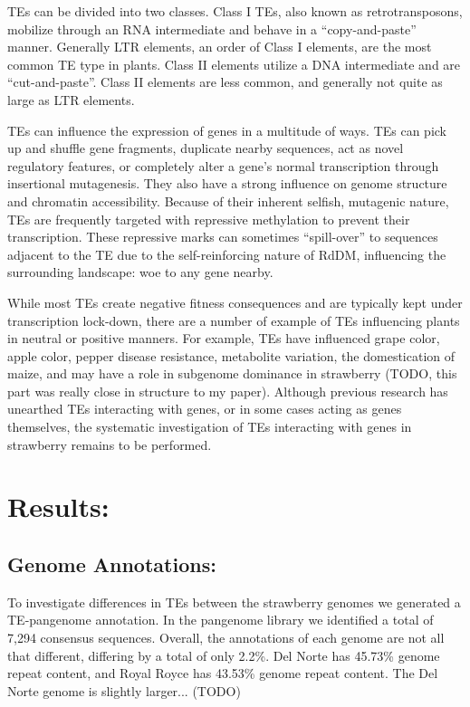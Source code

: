 \documentclass[fleqn,10pt]{olplainarticle}
\begin{document}
TEs can be divided into two classes.
Class I TEs, also known as retrotransposons, mobilize through an RNA intermediate and behave in a ``copy-and-paste'' manner.
Generally LTR elements, an order of Class I elements, are the most common TE type in plants.
Class II elements utilize a DNA intermediate and are ``cut-and-paste''.
Class II elements are less common, and generally not quite as large as LTR elements.

TEs can influence the expression of genes in a multitude of ways.
TEs can pick up and shuffle gene fragments, duplicate nearby sequences, act as novel regulatory features, or completely alter a gene's normal transcription through insertional mutagenesis.
They also have a strong influence on genome structure and chromatin accessibility.
Because of their inherent selfish, mutagenic nature, TEs are frequently targeted with repressive methylation to prevent their transcription.
These repressive marks can sometimes ``spill-over'' to sequences adjacent to the TE due to the self-reinforcing nature of RdDM, influencing the surrounding landscape: woe to any gene nearby.

While most TEs create negative fitness consequences and are typically kept under transcription lock-down, there are a number of example of TEs influencing plants in neutral or positive manners.
For example, TEs have influenced grape color, apple color, pepper disease resistance, metabolite variation, the domestication of maize, and may have a role in subgenome dominance in strawberry (TODO, this part was really close in structure to my paper).
Although previous research has unearthed TEs interacting with genes, or in some cases acting as genes themselves, the systematic investigation of TEs interacting with genes in strawberry remains to be performed.






\section{Results:}
\subsection{Genome Annotations:}
To investigate differences in TEs between the strawberry genomes we generated a TE-pangenome annotation.
In the pangenome library we identified a total of 7,294 consensus sequences.
Overall, the annotations of each genome are not all that different, differing by a total of only 2.2\%.
Del Norte has 45.73\% genome repeat content, and Royal Royce has 43.53\% genome repeat content.
The Del Norte genome is slightly larger... (TODO)
\end{document}
